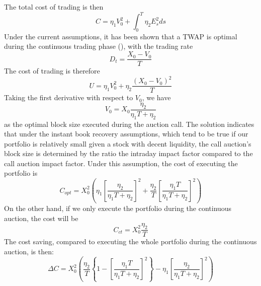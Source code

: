 \documentclass{article}
\begin{document}
The total cost of trading is then
\[
  C =\eta_1  V_0^2 + \int_0^T \eta_2 E_s^2 ds
\]
Under the current assumptions, it has been shown that a TWAP is optimal during the continuous trading phase (\cite{AlmgrenChriss2000}), with the trading rate
\[
  D_t = \frac{X_0 - V_0}{T}
\]
The cost of trading is therefore
\[
  U = \eta_1 V_0^2 + \eta_2 \frac{(X_0 - V_0)^2}{T}
\]
Taking the first derivative with respect to $V_0$, we have
\[
  V_0= X_0 \frac{\eta_2}{\eta_1 T +\eta_2}
\]
as the optimal block size executed during the auction call. The solution indicates that under the instant book recovery assumptions, which tend to be true if our portfolio is relatively small given a stock with decent liquidity, the call auction's block size is determined by the ratio the intraday impact factor compared to the call auction impact factor. Under this assumption, the cost of executing the portfolio is
\[
  C_{opt}  = X_0^2\left(\eta_1  \left[\frac{\eta_2}{\eta_1 T + \eta_2}\right]^2 + \frac{\eta_2}{T}  \left[\frac{\eta_1 T}{\eta_1 T + \eta_2}\right]^2 \right)
\]
On the other hand, if we only execute the portfolio during the continuous auction, the cost will be
\[
  C_{ct} =  X_0^2 \frac{\eta_2}{T}
\]
The cost saving, compared to executing the whole portfolio during the continuous auction, is then:
\[
  \Delta C = X_0^2\left(\frac{\eta_2}{T}  \left\{1 - \left[ \frac{\eta_1 T}{\eta_1 T + \eta_2}\right]^2\right\} - \eta_1  \left[\frac{\eta_2}{\eta_1 T + \eta_2}\right]^2\right)
\]
\end{document}
